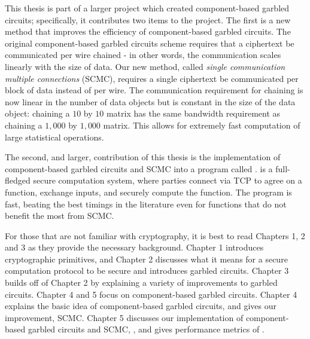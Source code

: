 This thesis is part of a larger project which created component-based garbled circuits; specifically, it contributes two items to the project.
The first is a new method that improves the efficiency of component-based garbled circuits. 
The original component-based garbled circuits scheme requires that a ciphertext be communicated per wire chained - in other words, the communication scales linearly with the size of data.
Our new method, called \textit{single communication multiple connections} (SCMC), requires a single ciphertext be communicated per block of data instead of per wire. 
The communication requirement for chaining is now linear in the number of data objects but is constant in the size of the data object: chaining a $10$ by $10$ matrix has the same bandwidth requirement as chaining a $1,000$ by $1,000$ matrix. 
This allows for extremely fast computation of large statistical operations. 

The second, and larger, contribution of this thesis is the implementation of component-based garbled circuits and SCMC into a program called \CompGC. 
\CompGC is a full-fledged secure computation system, where parties connect via TCP to agree on a function, exchange inputs, and securely compute the function.
The program is fast, beating the best timings in the literature even for functions that do not benefit the most from SCMC.

For those that are not familiar with cryptography, it is best to read Chapters 1, 2 and 3 as they provide the necessary background.
Chapter 1 introduces cryptographic primitives, and Chapter 2 discusses what it means for a secure computation protocol to be secure and introduces garbled circuits.
Chapter 3 builds off of Chapter 2 by explaining a variety of improvements to garbled circuits.
Chapter 4 and 5 focus on component-based garbled circuits.
Chapter 4 explains the basic idea of component-based garbled circuits, and gives our improvement, SCMC.
Chapter 5 discusses our implementation of component-based garbled circuits and SCMC, \CompGC, and gives performance metrics of \CompGC.







